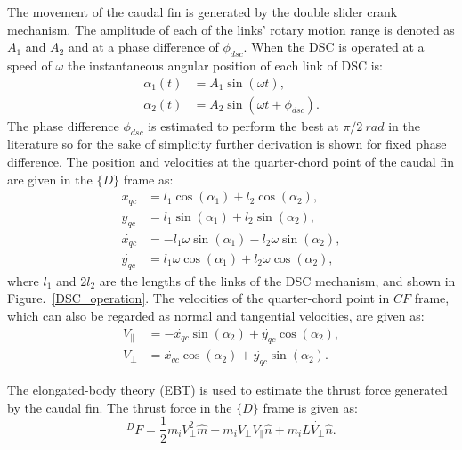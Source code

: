 \documentclass[pdflatex,sn-mathphys-num]{sn-jnl}
\theoremstyle{thmstyleone}%
\begin{document}
\par The movement of the caudal fin is generated by the double slider crank mechanism. The amplitude of each of the links' rotary motion range is denoted as $A_1$ and $A_2$ and at a phase difference of $\phi_{dsc}$. When the DSC is operated at a speed of $\omega$ the instantaneous angular position of each link of DSC is:
\begin{equation}
    \begin{aligned}
        \alpha_1(t) &= A_1 \sin(\omega t), \\
        \alpha_2(t) &= A_2 \sin(\omega t + \phi_{dsc}).
    \end{aligned}
\end{equation}
The phase difference $\phi_{dsc}$ is estimated to perform the best at $\pi/2~rad$ in the literature \cite{Zuo2021} so for the sake of simplicity further derivation is shown for fixed phase difference. The position and velocities at the quarter-chord point of the caudal fin are given in the $\{D\}$ frame as:
\begin{equation}
    \begin{aligned}
        x_{qc} &= l_1 \cos(\alpha_1) + l_2 \cos(\alpha_2), \\
        y_{qc} &= l_1 \sin(\alpha_1) + l_2 \sin(\alpha_2), \\
        \dot{x_{qc}} &= -l_1 \omega \sin(\alpha_1) - l_2 \omega \sin(\alpha_2), \\
        \dot{y_{qc}} &= l_1 \omega \cos(\alpha_1) + l_2 \omega \cos(\alpha_2),
    \end{aligned}
\end{equation}
where $l_1$ and $2l_2$ are the lengths of the links of the DSC mechanism, and shown in Figure.~\ref{DSC_operation}. The velocities of the quarter-chord point in ${CF}$ frame, which can also be regarded as normal and tangential velocities, are given as:
\begin{equation}
    \begin{aligned}
        V_\parallel &= - \dot{x_{qc}} \sin(\alpha_2) + \dot{y_{qc}} \cos(\alpha_2),  \\
        V_\perp  &= \dot{x_{qc}} \cos(\alpha_2) + \dot{y_{qc}} \sin(\alpha_2).
    \end{aligned}
\end{equation}
\par The elongated-body theory (EBT) is used to estimate the thrust force generated by the caudal fin. The thrust force in the $\{D\}$ frame is given as:
\begin{equation}
    {}^{D}F = \frac{1}{2} m_i V_\perp^2 \hat{m} - m_i V_\perp V_\parallel \hat{n} + m_i L \dot{V_\perp} \hat{n}.
\end{equation}
\end{document}
